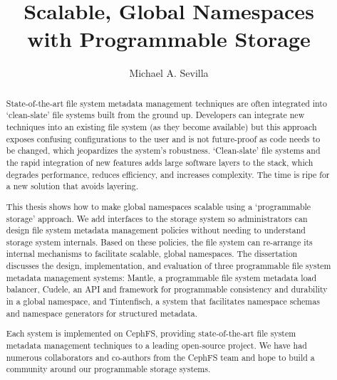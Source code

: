 \title{Scalable, Global Namespaces\\with Programmable Storage}
\author{Michael A. Sevilla}
\deanlinethree{}

\begin{frontmatter}
	\maketitle\copyrightpage\tableofcontents\listoffigures\listoftables
	\begin{abstract}

State-of-the-art file system metadata management techniques are often
integrated into `clean-slate' file systems built from the ground up. Developers
can integrate new techniques into an existing file system (as they become
available) but this approach exposes confusing configurations to the user and
is not future-proof as code needs to be changed, which jeopardizes the
system's robustness. `Clean-slate' file systems and the rapid integration of
new features adds large software layers to the stack, which degrades
performance, reduces efficiency, and increases complexity. The time is ripe for
a new solution that avoids layering.

This thesis shows how to make global namespaces scalable using a `programmable
storage' approach. We add interfaces to the storage system so administrators
can design file system metadata management policies without needing to
understand storage system internals. Based on these policies, the file system
can re-arrange its internal mechanisms to facilitate scalable, global
namespaces.  The dissertation discusses the design, implementation, and
evaluation of three programmable file system metadata management systems:
Mantle, a programmable file system metadata load balancer, Cudele, an API and
framework for programmable consistency and durability in a global namespace,
and Tintenfisch, a system that facilitates namespace schemas and namespace
generators for structured metadata.

Each system is implemented on CephFS, providing state-of-the-art file system
metadata management techniques to a leading open-source project. We have had
numerous collaborators and co-authors from the CephFS team and hope to build a
community around our programmable storage systems.


\end{abstract}
\end{frontmatter}
